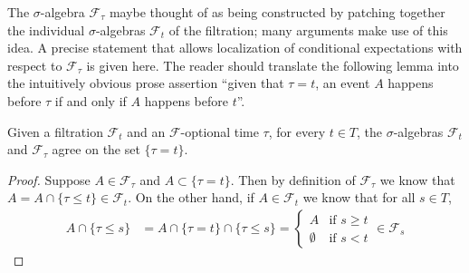The $\sigma$-algebra $\mathcal{F}_\tau$ maybe thought of as being constructed by patching
together the individual $\sigma$-algebras $\mathcal{F}_t$ of the
filtration; many arguments make use of this idea.  A precise statement
that allows localization of conditional expectations with respect to
$\mathcal{F}_\tau$ is given here.  The reader should translate the
following lemma into the intuitively obvious prose assertion ``given
that $\tau = t$, an event $A$ happens before
$\tau$ if and only if $A$ happens before $t$''.
\begin{lem}\label{LocalizationOfStoppedFiltration}Given a filtration $\mathcal{F}_t$ and an
  $\mathcal{F}$-optional time $\tau$, for every $t \in T$, the $\sigma$-algebras
  $\mathcal{F}_t$ and $\mathcal{F}_\tau$ agree on the set $\lbrace
  \tau = t\rbrace$.
\end{lem}
\begin{proof}
Suppose $A \in \mathcal{F}_\tau$ and $A \subset \lbrace \tau = t
\rbrace$.  Then by definition of $\mathcal{F}_\tau$ we know that $A = A
\cap \lbrace \tau \leq t \rbrace \in \mathcal{F}_t$.  On the other
hand, if $A \in \mathcal{F}_t$ we know that for all $s \in T$,
\begin{align*}
A \cap \lbrace \tau \leq s \rbrace &= A \cap \lbrace \tau = t
\rbrace \cap\lbrace \tau \leq s \rbrace = \begin{cases}
A & \text{if $s \geq t$} \\
\emptyset & \text{if $s < t$}
\end{cases}
\in \mathcal{F}_s
\end{align*}
\end{proof}

